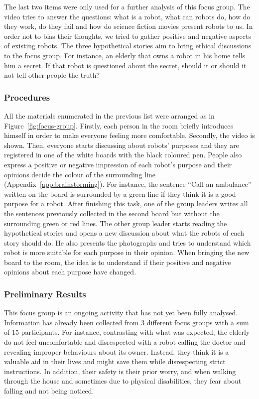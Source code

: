 The last two items were only used for a further analysis of this focus group.
The video tries to answer the questions: what is a robot, what can robots do, how do they work, do they fail and how do science fiction movies present robots to us.
In order not to bias their thoughts, we tried to gather positive and negative aspects of existing robots.
The three hypothetical stories aim to bring ethical discussions to the focus group.
For instance, an elderly that owns a robot in his home tells him a secret.
If that robot is questioned about the secret, should it or should it not tell other people the truth?

\subsubsection{Procedures}
All the materials enumerated in the previous list were arranged as in Figure~\ref{fig:focus-group}.
Firstly, each person in the room briefly introduces himself in order to make everyone feeling more comfortable.
Secondly, the video is shown.
Then, everyone starts discussing about robots' purposes and they are registered in one of the white boards with the black coloured pen.
People also express a positive or negative impression of each robot's purpose and their opinions decide the colour of the surrounding line (Appendix~\ref{app:brainstorming}).
For instance, the sentence ``Call an ambulance'' written on the board is surrounded by a green line if they think it is a good purpose for a robot.
After finishing this task, one of the group leaders writes all the sentences previously collected in the second board but without the surrounding green or red lines.
The other group leader starts reading the hypothetical stories and opens a new discussion about what the robots of each story should do.
He also presents the photographs and tries to understand which robot is more suitable for each purpose in their opinion.
When bringing the new board to the room, the idea is to understand if their positive and negative opinions about each purpose have changed.


\subsubsection{Preliminary Results}

This focus group is an ongoing activity that has not yet been fully analysed.
Information has already been collected from 3 different focus groups with a sum of 15 participants.
For instance, contrasting with what was expected, the elderly do not feel uncomfortable and disrespected with a robot calling the doctor and revealing improper behaviours about its owner.
Instead, they think it is a valuable aid in their lives and might save them while disrespecting strict instructions.
In addition, their safety is their prior worry, and when walking through the house and sometimes due to physical disabilities, they fear about falling and not being noticed.




